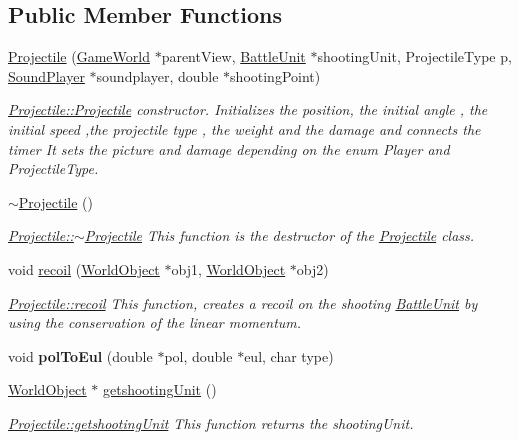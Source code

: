 \subsection*{Public Member Functions}
\begin{DoxyCompactItemize}
\item 
\hyperlink{class_projectile_a78d923a25fe271ac68edc1f1de95e3e8}{Projectile} (\hyperlink{class_game_world}{Game\+World} $\ast$parent\+View, \hyperlink{class_battle_unit}{Battle\+Unit} $\ast$shooting\+Unit, Projectile\+Type p, \hyperlink{class_sound_player}{Sound\+Player} $\ast$soundplayer, double $\ast$shooting\+Point)
\begin{DoxyCompactList}\small\item\em \hyperlink{class_projectile_a78d923a25fe271ac68edc1f1de95e3e8}{Projectile\+::\+Projectile} constructor. Initializes the position, the initial angle , the initial speed ,the projectile type , the weight and the damage and connects the timer It sets the picture and damage depending on the enum Player and Projectile\+Type. \end{DoxyCompactList}\item 
\hyperlink{class_projectile_a94903e021fa2edab60ba3836ca0b937d}{$\sim$\+Projectile} ()\hypertarget{class_projectile_a94903e021fa2edab60ba3836ca0b937d}{}\label{class_projectile_a94903e021fa2edab60ba3836ca0b937d}

\begin{DoxyCompactList}\small\item\em \hyperlink{class_projectile_a94903e021fa2edab60ba3836ca0b937d}{Projectile\+::$\sim$\+Projectile} This function is the destructor of the \hyperlink{class_projectile}{Projectile} class. \end{DoxyCompactList}\item 
void \hyperlink{class_projectile_a0c2d868fd9e05d3055b8f625399d7909}{recoil} (\hyperlink{class_world_object}{World\+Object} $\ast$obj1, \hyperlink{class_world_object}{World\+Object} $\ast$obj2)
\begin{DoxyCompactList}\small\item\em \hyperlink{class_projectile_a0c2d868fd9e05d3055b8f625399d7909}{Projectile\+::recoil} This function, creates a recoil on the shooting \hyperlink{class_battle_unit}{Battle\+Unit} by using the conservation of the linear momentum. \end{DoxyCompactList}\item 
void {\bfseries pol\+To\+Eul} (double $\ast$pol, double $\ast$eul, char type)\hypertarget{class_projectile_ae66148108698335706f51a19aaec764c}{}\label{class_projectile_ae66148108698335706f51a19aaec764c}

\item 
\hyperlink{class_world_object}{World\+Object} $\ast$ \hyperlink{class_projectile_aa8868e4a292212337b3d6de12e9da63a}{getshooting\+Unit} ()
\begin{DoxyCompactList}\small\item\em \hyperlink{class_projectile_aa8868e4a292212337b3d6de12e9da63a}{Projectile\+::getshooting\+Unit} This function returns the shooting\+Unit. \end{DoxyCompactList}\end{DoxyCompactItemize}
